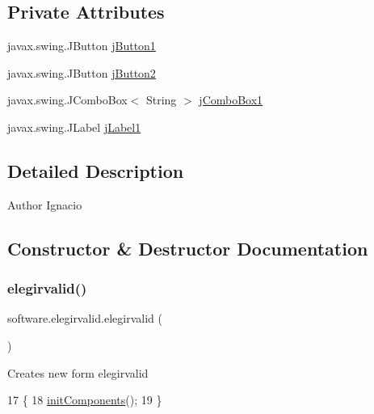 \subsection*{Private Attributes}
\begin{DoxyCompactItemize}
\item 
javax.\+swing.\+J\+Button \mbox{\hyperlink{classsoftware_1_1elegirvalid_a2e45ed3b1ed8951950588a561e23a890}{j\+Button1}}
\item 
javax.\+swing.\+J\+Button \mbox{\hyperlink{classsoftware_1_1elegirvalid_a9923ae8164e7886f8cf993f534e932ad}{j\+Button2}}
\item 
javax.\+swing.\+J\+Combo\+Box$<$ String $>$ \mbox{\hyperlink{classsoftware_1_1elegirvalid_a478fdcb1e161a2c0db069e191d614075}{j\+Combo\+Box1}}
\item 
javax.\+swing.\+J\+Label \mbox{\hyperlink{classsoftware_1_1elegirvalid_a77ded24e7c4de4317d1e1ea4dea875e6}{j\+Label1}}
\end{DoxyCompactItemize}


\subsection{Detailed Description}
\begin{DoxyAuthor}{Author}
Ignacio 
\end{DoxyAuthor}


\subsection{Constructor \& Destructor Documentation}
\mbox{\label{classsoftware_1_1elegirvalid_a6b0b84f3a6730a79b6feb0684e6f54e6}} 
\subsubsection{\texorpdfstring{elegirvalid()}{elegirvalid()}}
{\footnotesize\ttfamily software.\+elegirvalid.\+elegirvalid (\begin{DoxyParamCaption}{ }\end{DoxyParamCaption})\hspace{0.3cm}{\ttfamily [inline]}}

Creates new form elegirvalid 
\begin{DoxyCode}
17                          \{
18         \mbox{\hyperlink{classsoftware_1_1elegirvalid_a82dfc7ee539e30a0864221d3e6e5f58e}{initComponents}}();
19     \}
\end{DoxyCode}


